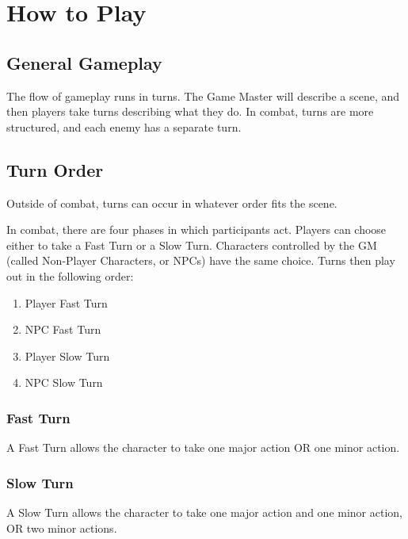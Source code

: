 \chapter{How to Play}

\begin{multicols}{2}

\section{General Gameplay}

The flow of gameplay runs in turns. The Game Master will
describe a scene, and then players take turns describing
what they do. In combat, turns are more structured, and each
enemy has a separate turn.

\section{Turn Order}

Outside of combat, turns can occur in whatever order fits the
scene.

In combat, there are four phases in which participants
act. Players can choose either to take a Fast Turn or a Slow
Turn. Characters controlled by the GM (called Non-Player
Characters, or NPCs) have the same choice. Turns then play out
in the following order:

\begin{enumerate}
  \item Player Fast Turn
  \item NPC Fast Turn
  \item Player Slow Turn
  \item NPC Slow Turn
\end{enumerate}

\subsection{Fast Turn}

A Fast Turn allows the character to take one major action OR
one minor action.

\subsection{Slow Turn}

A Slow Turn allows the character to take one major action and
one minor action, OR two minor actions.


\end{multicols}
